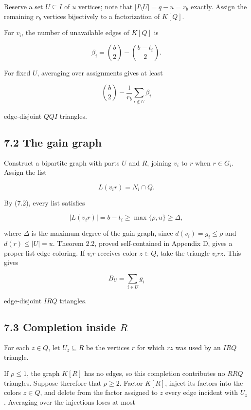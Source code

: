\documentclass[english,11pt,a4paper]{article}
\begin{document}
Reserve a set \(U\subseteq I\) of \(u\) vertices; note that
\(|I\setminus U|=q-u=r_b\) exactly. Assign the remaining \(r_b\)
vertices bijectively to a factorization of \(K[Q]\).

For \(v_i\), the number of unavailable edges of \(K[Q]\) is

\[
\beta_i
=
\binom b2-\binom{b-t_i}{2}.
\tag{7.4}
\]

For fixed \(U\), averaging over assignments gives at least

\[
\binom b2-\frac1{r_b}\sum_{i\notin U}\beta_i
\tag{7.5}
\]

edge-disjoint \(QQI\) triangles.

\subsection{7.2 The gain graph}\label{the-gain-graph}

Construct a bipartite graph with parts \(U\) and \(R\), joining \(v_i\)
to \(r\) when \(r\in G_i\). Assign the list

\[
L(v_ir)=N_i\cap Q.
\]

By (7.2), every list satisfies

\[
|L(v_ir)|=b-t_i
\ge
\max\{\rho,u\}
\ge
\Delta,
\]

where \(\Delta\) is the maximum degree of the gain graph, since
\(d(v_i)=g_i\le\rho\) and \(d(r)\le|U|=u\). Theorem 2.2, proved
self-contained in Appendix D, gives a proper list edge coloring. If
\(v_ir\) receives color \(z\in Q\), take the triangle \(v_irz\). This
gives

\[
B_U=\sum_{i\in U}g_i
\]

edge-disjoint \(IRQ\) triangles.

\subsection{\texorpdfstring{7.3 Completion inside
\(R\)}{7.3 Completion inside R}}\label{completion-inside-r}

For each \(z\in Q\), let \(U_z\subseteq R\) be the vertices \(r\) for
which \(rz\) was used by an \(IRQ\) triangle.

If \(\rho\le1\), the graph \(K[R]\) has no edges, so this completion
contributes no \(RRQ\) triangles. Suppose therefore that \(\rho\ge2\).
Factor \(K[R]\), inject its factors into the colors \(z\in Q\), and
delete from the factor assigned to \(z\) every edge incident with
\(U_z\). Averaging over the injections loses at most
\end{document}
